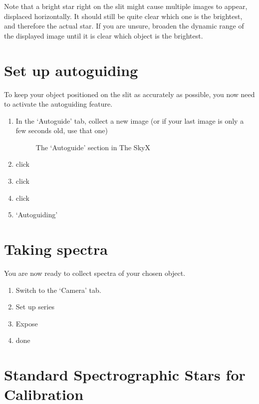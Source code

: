 \documentclass[12pt,twoside,a4paper]{report}
\begin{document}
Note that a bright star right on the slit might cause multiple images to appear, displaced horizontally. It should still be quite clear which one is the brightest, and therefore the actual star. If you are unsure, broaden the dynamic range of the displayed image until it is clear which object is the brightest.


\section{Set up autoguiding}

To keep your object positioned on the slit as accurately as possible, you now need to activate the autoguiding feature.

\begin{enumerate}
 \item In the `Autoguide' tab, collect a new image (or if your last image is only a few seconds old, use that one)

  \begin{figure}[ht]
  \centering
    \caption{\label{fig:autoguide}The `Autoguide' section in The SkyX}
 \end{figure}

 \item click
 \item click
 \item click
 \item `Autoguiding'

\end{enumerate}


\section{Taking spectra}

You are now ready to collect spectra of your chosen object.

\begin{enumerate}
 \item Switch to the `Camera' tab.
 \item Set up series
 \item Expose
 \item done
\end{enumerate}

\section{Standard Spectrographic Stars for Calibration}
\end{document}

